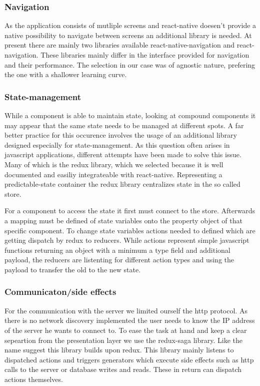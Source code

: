 \documentclass[conference]{IEEEtran}
\begin{document}

\subsubsection{Navigation}
As the application consists of mutliple screens and react-native doesen't provide a native possibility to navigate between screens an 
additional library is needed. At present there are mainly two libraries available react-native-navigation and react-navigation. These
libraries mainly differ in the interface provided for navigation and their performance. The selection in our case was of agnostic nature,
prefering the one with a shallower learning curve. 

\subsubsection{State-management}
While a component is able to maintain state, looking at compound components it may appear that the same state needs to be managed at
different spots. A far better practice for this occurence involves the usage of an additional library designed especially for 
state-management. As this question often arises in javascript applications, different attempts have been made to solve this issue.
Many of which is the redux library, which we selected because it is well documented and easiliy integrateable with react-native.
Representing a predictable-state container the redux library centralizes state in the so called store. 

For a component to access the state it first must connect to the store. Afterwards a mapping must be defined of state variables onto the
property object of that specific component. To change state variables actions needed to defined which are getting dispatch by redux to
reducers. While actions represent simple javascript functions returning an object with a minimum a type field and additional payload,
the reducers are listenting for different action types and using the payload to transfer the old to the new state. 

\subsubsection{Communicaton/side effects}
For the communication with the server we limited ourself the http protocol. As there is no network discovery implemented the user needs
to know the IP address of the server he wants to connect to. To ease the task at hand and keep a clear sepeartion from the presentation
layer we use the redux-saga library. Like the name suggest this library builds upon redux. This library mainly listens to dispatched
actions and triggers generators which execute side effects such as http calls to the server or database writes and reads. These in
return can dispatch actions themselves.
\end{document}
